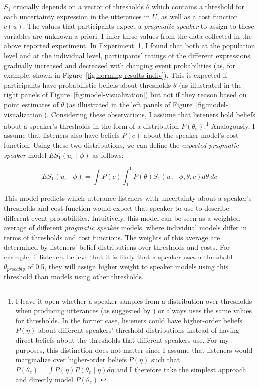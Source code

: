 $S_1$ crucially depends on a vector of thresholds $\theta$ which contains a threshold for each uncertainty expression in the utterances in $U$, 
as well as a cost function $c(u)$. The values that participants expect a \textit{pragmatic speaker} to assign 
to these variables are unknown a priori; I infer these values from the data collected in the above reported experiment. 
In Experiment~1, I found that both at the population level and at the individual level, 
participants' ratings of the different expressions gradually increased and decreased with changing event probabilities 
(as, for example, shown in Figure~\ref{fig:norming-results-indiv}). This is expected if participants
have probabilistic beliefs about thresholds $\theta$ (as illustrated in the right panels of Figure~\ref{fig:model-visualization}) but not if they reason based on point estimates of $\theta$ (as illustrated in the left panels of Figure~\ref{fig:model-visualization}).
Considering these observations,  I assume that listeners hold beliefs about a speaker's thresholds in the form of a distribution $P\left(\theta_e\right)$.\footnote{I leave it open 
whether a {speaker} samples from a distribution over thresholds when producing utterances (as suggested by \textcite{Qing2015}) 
or always uses the same values for thresholds. In the former case, listeners could have higher-order beliefs  $P(\eta)$ 
about different {speakers}' threshold distributions instead of having direct beliefs about the thresholds that different 
{speakers} use. For my purposes, this distinction does not matter since I assume that listeners would marginalize over higher-order beliefs $P(\eta)$ such that  $P\left(\theta_e\right) = \int P\left(\eta\right) P\left(\theta_e \mid \eta\right) d\eta$ and I therefore take the simplest approach and directly model $P\left(\theta_e\right)$. } Analogously, I assume that  listeners also have beliefs $P(c)$ about the speaker model's cost function.
Using these two distributions, we can define the \textit{expected pragmatic speaker} model $ES_1\left(u_e \mid \phi \right)$ as follows:

$$ES_1\left(u_e \mid \phi \right) = \int P(c) \int_0^1 P(\theta) S_1\left(u _e\mid \phi, \theta, c\right) d\theta \  d c$$

This model predicts which utterance listeners with uncertainty about a speaker's thresholds and cost function would expect that {speaker} to use to describe different event probabilities. 
Intuitively, this model can be seen as a weighted average of different \textit{pragmatic speaker} models, where individual models differ in terms of thresholds and cost functions.  The weights of this average are determined by listeners' belief distributions over thresholds and costs. For example, if listeners believe that it is likely that a speaker uses a threshold $\theta_{probably}$ of 0.5, they will assign higher weight to speaker models
using this threshold than models using other thresholds. 

